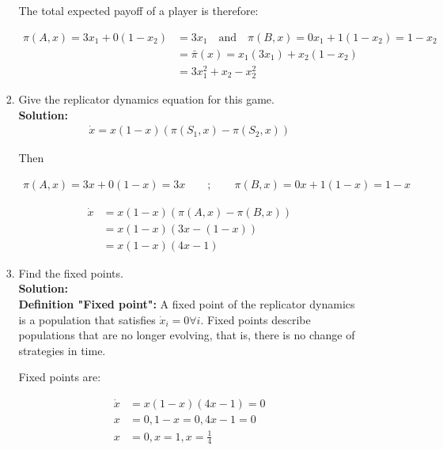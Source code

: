 \documentclass[a4paper]{article}
\begin{document}
\begin{enumerate}
\begin{enumerate}
\begin{enumerate}
				
				The total expected payoff of a player is therefore:
				
				\begin{align*}
				    \pi(A,x) = 3x_1 + 0(1 - x_2) &= 3x_1 \quad \text{and} \quad \pi(B,x) = 0x_1 + 1(1-x_2) = 1 - x_2\\
				    &= \bar{\pi}(x) = x_1(3x_1) + x_2(1 - x_2)\\
				    &= 3x_1^2 + x_2 - x_2^2
				\end{align*}
				
				
				
				\item Give the replicator dynamics equation for this game.\\
				\textbf{Solution:}\\
				

				
				\begin{align*}
				    \dot{x} = x(1 - x)(\pi(S_1, x) - \pi(S_2, x))
				\end{align*}
				
				Then 
				
				\begin{align*}
				    \pi(A,x) = 3x + 0(1 - x) = 3x \qquad ; \qquad \pi(B,x) = 0x + 1(1 - x) = 1 - x
				\end{align*}
				

                \begin{align*}
                    \dot{x} &= x(1-x)(\pi(A,x) - \pi(B,x))\\
                    &= x(1-x)(3x - (1 - x))\\
                    &= x(1-x)(4x - 1)
                \end{align*}
				
				
				
				
				\item Find the fixed points.\\
				\textbf{Solution:}\\
				
				\textbf{Definition "Fixed point":} A fixed point of the replicator dynamics is a population that satisfies $\dot{x}_i = 0 \forall i$. Fixed points describe populations that are no longer evolving, that is, there is no change of strategies in time.\vspace{1em}
				
				Fixed points are:
				
				\begin{align*}
                    \dot{x} &= x(1-x)(4x - 1) = 0\\
                    x &= 0,  1 - x = 0, 4x -1 = 0\\
                    x &= 0, x = 1, x = \frac{1}{4}
                \end{align*}
				

\end{enumerate}
\end{enumerate}
\end{enumerate}
\end{document}
